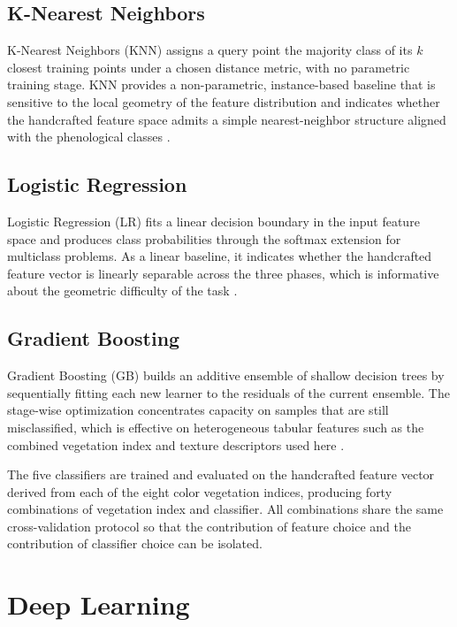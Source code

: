 \subsection{K-Nearest Neighbors}

K-Nearest Neighbors (KNN) assigns a query point the majority class of its $k$ closest training points under a chosen distance metric, with no parametric training stage. KNN provides a non-parametric, instance-based baseline that is sensitive to the local geometry of the feature distribution and indicates whether the handcrafted feature space admits a simple nearest-neighbor structure aligned with the phenological classes \cite{benos2021ml}.

\subsection{Logistic Regression}

Logistic Regression (LR) fits a linear decision boundary in the input feature space and produces class probabilities through the softmax extension for multiclass problems. As a linear baseline, it indicates whether the handcrafted feature vector is linearly separable across the three phases, which is informative about the geometric difficulty of the task \cite{benos2021ml}.

\subsection{Gradient Boosting}

Gradient Boosting (GB) builds an additive ensemble of shallow decision trees by sequentially fitting each new learner to the residuals of the current ensemble. The stage-wise optimization concentrates capacity on samples that are still misclassified, which is effective on heterogeneous tabular features such as the combined vegetation index and texture descriptors used here \cite{benos2021ml}.

The five classifiers are trained and evaluated on the handcrafted feature vector derived from each of the eight color vegetation indices, producing forty combinations of vegetation index and classifier. All combinations share the same cross-validation protocol so that the contribution of feature choice and the contribution of classifier choice can be isolated.

\section{Deep Learning}


